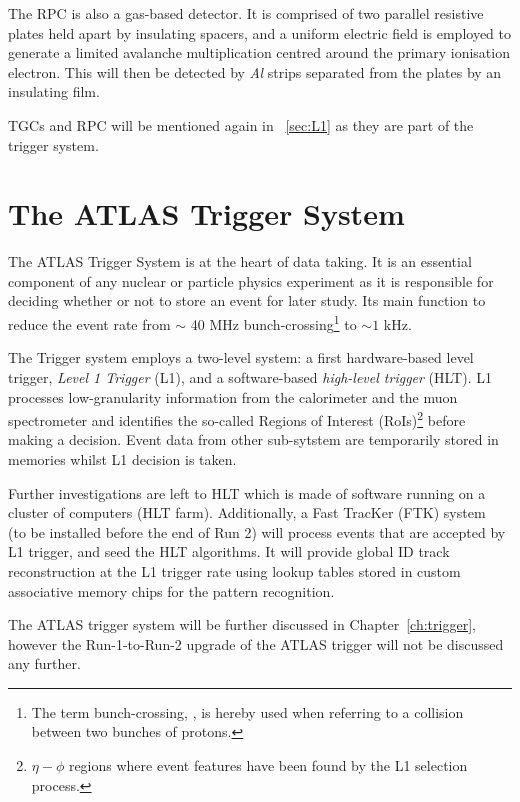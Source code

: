 			The RPC is also a gas-based detector. It is comprised of two parallel resistive plates held apart by insulating spacers, and a uniform electric field is employed to generate a limited avalanche multiplication centred around the primary ionisation electron. This will then be detected by \emph{Al} strips separated from the plates by an insulating film.

			TGCs and RPC will be mentioned again in ~\ref{sec:L1} as they are part of the trigger system.


	\section{The ATLAS Trigger System}
	\label{sec:trigSyst}

		The ATLAS Trigger System is at the heart of data taking. It is an essential component of any nuclear or particle physics experiment as it is responsible for deciding whether or not to store an event for later study. Its main function to reduce the event rate from $\sim$ 40 MHz bunch-crossing\footnote{The term bunch-crossing, \mubar, is hereby used when referring to a collision between two bunches of protons.} to $\sim 1$ kHz.

		The Trigger system employs a two-level system: a first hardware-based level trigger, \emph{Level 1 Trigger} (L1), and a software-based \emph{high-level trigger} (HLT). L1 processes low-granularity information from the calorimeter and the muon spectrometer and identifies the so-called Regions of Interest (RoIs)\footnote{$\eta - \phi$ regions where event features have been found by the L1 selection process.} before making a decision. Event data from other sub-sytstem are temporarily stored in memories whilst L1 decision is taken.
		
		Further investigations are left to HLT which is made of software running on a cluster of computers (HLT farm). Additionally, a Fast TracKer (FTK) system~\cite{FTKTDR} (to be installed before the end of Run 2) will process events that are accepted by L1 trigger, and seed the HLT algorithms. It will provide global ID track reconstruction at the L1 trigger rate using lookup tables stored in custom associative memory chips for the pattern recognition.
		
		The ATLAS trigger system will be further discussed in Chapter~\ref{ch:trigger}, however the Run-1-to-Run-2 upgrade of the ATLAS trigger will not be discussed any further.